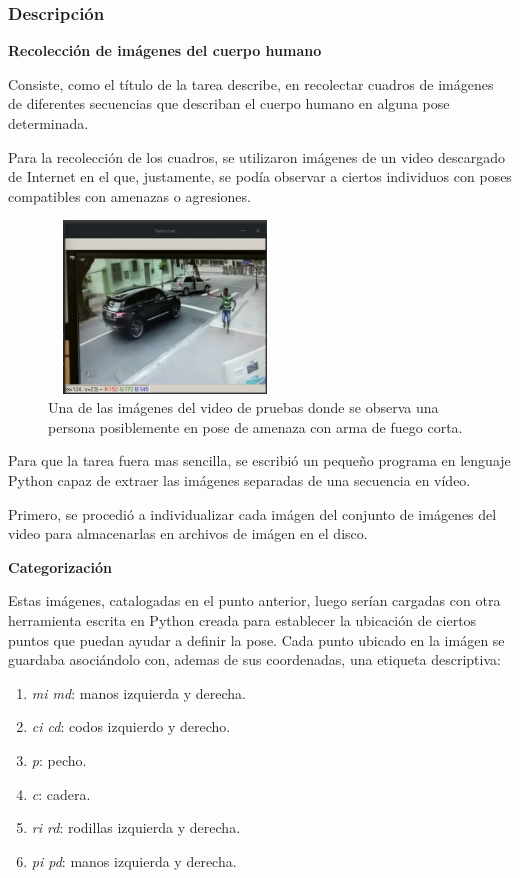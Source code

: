 \documentclass[a4paper,12pt,oneside,spanish]{book}
\begin{document}
\subsubsection{Descripción}


\textbf{Recolección de imágenes del cuerpo humano}\par

Consiste, como el título de la tarea describe, en recolectar cuadros de imágenes de diferentes secuencias que describan el cuerpo humano en alguna pose determinada.\par 

Para la recolección de los cuadros, se utilizaron imágenes de un video descargado de Internet en el que, justamente, se podía observar a ciertos individuos con poses compatibles con amenazas o agresiones.\par 

\begin{figure}[h!]
	\includegraphics[width=175pt,height=130pt]{Imagenes/video1.jpg}
	\centering
	\caption{Una de las imágenes del video de pruebas donde se observa una persona posiblemente en pose de amenaza con arma de fuego corta.}
	\label{fig:video1}
\end{figure}

Para que la tarea fuera mas sencilla, se escribió un pequeño programa en lenguaje Python capaz de extraer las imágenes separadas de una secuencia en vídeo.\par 

Primero, se procedió a individualizar cada imágen del conjunto de imágenes del video para almacenarlas en archivos de imágen en el disco.\par 

\textbf{Categorización}\par

Estas imágenes, catalogadas en el punto anterior, luego serían cargadas con otra herramienta escrita en Python creada para establecer la ubicación de ciertos puntos que puedan ayudar a definir la pose. Cada punto ubicado en la imágen se guardaba asociándolo con, ademas de sus coordenadas, una etiqueta descriptiva:
\begin{enumerate}\baselineskip 16pt	
	\item \textit{mi md}: manos izquierda y derecha.
	\item \textit{ci cd}: codos izquierdo y derecho.
	\item \textit{p}: pecho.
	\item \textit{c}: cadera.
	\item \textit{ri rd}: rodillas izquierda y derecha.
	\item \textit{pi pd}: manos izquierda y derecha.
\end{enumerate}	\baselineskip 16pt	
	
\end{document}
